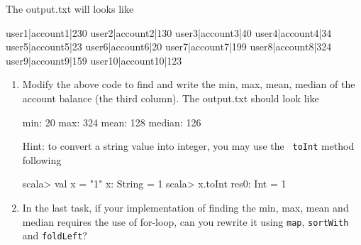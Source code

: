 \documentclass[10pt]{article}
\begin{document}
The output.txt will looks like
\begin{code}
user1|account1|230
user2|account2|130
user3|account3|40
user4|account4|34
user5|account5|23
user6|account6|20
user7|account7|199
user8|account8|324
user9|account9|159
user10|account10|123
\end{code}


\begin{enumerate}
 \item  Modify the above code to find and write the min, max, mean,
   median of the account balance (the third column). The output.txt
   should look like
\begin{code}
min: 20
max: 324
mean: 128
median: 126
\end{code}
  Hint: to convert a string value into integer, you may use the {\tt
    toInt} method
  following
\begin{code}
scala> val x = "1"
x: String = 1
scala> x.toInt
res0: Int = 1
\end{code}
 \item In the last task, if your implementation of finding the min,
   max, mean and median requires the use of for-loop, can you rewrite
   it using {\tt map}, {\tt sortWith} and {\tt foldLeft}?
\end{enumerate}
\end{document}
